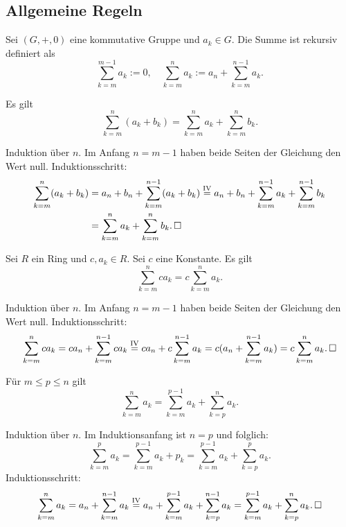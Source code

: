 \subsection{Allgemeine Regeln}

\begin{Definition}[Summe]
Sei $(G,+,0)$ eine kommutative Gruppe und $a_k\in G$. Die Summe ist
rekursiv definiert als
\[\sum_{k=m}^{m-1} a_k := 0,\quad \sum_{k=m}^n a_k
:= a_n + \sum_{k=m}^{n-1} a_k.\]
\end{Definition}

\begin{Satz}\label{sum-add}
Es gilt
\[\sum_{k=m}^n (a_k + b_k) = \sum_{k=m}^n a_k + \sum_{k=m}^n b_k.\]
\end{Satz}
\begin{Beweis} Induktion über $n$. Im Anfang $n=m-1$ haben
beide Seiten der Gleichung den Wert null. Induktionsschritt:
\begin{align*}
\sum_{k=m}^n (a_k+b_k) &= a_n + b_n + \sum_{k=m}^{n-1} (a_k+b_k)
\stackrel{\mathrm{IV}}= a_n + b_n + \sum_{k=m}^{n-1} a_k + \sum_{k=m}^{n-1} b_k\\
&= \sum_{k=m}^n a_k + \sum_{k=m}^n b_k.\,\square
\end{align*}
\end{Beweis}

\begin{Satz}\label{sum-scale}
Sei $R$ ein Ring und $c,a_k\in R$. Sei $c$ eine
Konstante. Es gilt
\[\sum_{k=m}^n ca_k = c\sum_{k=m}^n a_k.\]
\end{Satz}
\begin{Beweis} Induktion über $n$. Im Anfang $n=m-1$ haben beide
Seiten der Gleichung den Wert null. Induktionsschritt:
\[\sum_{k=m}^n ca_k = ca_n + \sum_{k=m}^{n-1} ca_k
\stackrel{\mathrm{IV}}= ca_n + c\sum_{k=m}^{n-1} a_k
= c(a_n + \sum_{k=m}^{n-1} a_k) = c\sum_{k=m}^n a_k.\,\square\]
\end{Beweis}

\begin{Satz}\label{sum-split}
Für $m\le p\le n$ gilt
\[\sum_{k=m}^n a_k = \sum_{k=m}^{p-1} a_k + \sum_{k=p}^n a_k.\]
\end{Satz}
\begin{Beweis} Induktion über $n$. Im Induktionsanfang ist $n=p$
und folglich:
\[\sum_{k=m}^p a_k = \sum_{k=m}^{p-1} a_k + p_k
= \sum_{k=m}^{p-1} a_k + \sum_{k=p}^p a_k.\]
Induktionsschritt:
\[\sum_{k=m}^n a_k = a_n + \sum_{k=m}^{n-1} a_k
\stackrel{\mathrm{IV}}= a_n + \sum_{k=m}^{p-1} a_k + \sum_{k=p}^{n-1} a_k
= \sum_{k=m}^{p-1} a_k + \sum_{k=p}^n a_k.\,\square\]
\end{Beweis}

